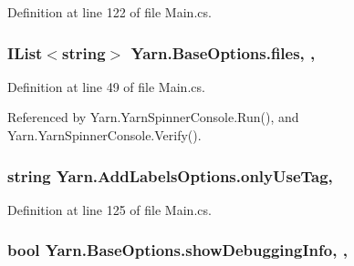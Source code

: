 Definition at line 122 of file Main.\-cs.

\hypertarget{a00043_aa93cbb1bc1d5328e0a417012621e92d2}{
\subsubsection[{files}]{\setlength{\rightskip}{0pt plus 5cm}I\-List$<$string$>$ Yarn.\-Base\-Options.\-files\hspace{0.3cm}{\ttfamily [get]}, {\ttfamily [set]}, {\ttfamily [inherited]}}}\label{a00043_aa93cbb1bc1d5328e0a417012621e92d2}


Definition at line 49 of file Main.\-cs.



Referenced by Yarn.\-Yarn\-Spinner\-Console.\-Run(), and Yarn.\-Yarn\-Spinner\-Console.\-Verify().

\hypertarget{a00039_ab6162338f9606a836f3101fe0e228249}{
\subsubsection[{only\-Use\-Tag}]{\setlength{\rightskip}{0pt plus 5cm}string Yarn.\-Add\-Labels\-Options.\-only\-Use\-Tag\hspace{0.3cm}{\ttfamily [get]}, {\ttfamily [set]}}}\label{a00039_ab6162338f9606a836f3101fe0e228249}


Definition at line 125 of file Main.\-cs.

\hypertarget{a00043_a89964ea17bd19caf00cb5bff563ed01c}{
\subsubsection[{show\-Debugging\-Info}]{\setlength{\rightskip}{0pt plus 5cm}bool Yarn.\-Base\-Options.\-show\-Debugging\-Info\hspace{0.3cm}{\ttfamily [get]}, {\ttfamily [set]}, {\ttfamily [inherited]}}}\label{a00043_a89964ea17bd19caf00cb5bff563ed01c}


